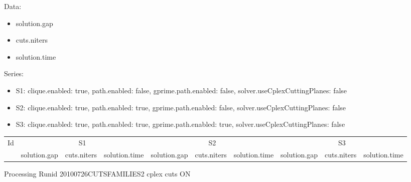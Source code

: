 \documentclass[landscape, 12pt]{report}
\begin{document}
	Data:
	\begin{itemize}
	\item solution.gap
	\item cuts.niters
	\item solution.time
	\end{itemize}
	Series:
	\begin{itemize}
	\item S1: clique.enabled: true, path.enabled: false, gprime.path.enabled: false, solver.useCplexCuttingPlanes: false
	\item S2: clique.enabled: true, path.enabled: true, gprime.path.enabled: false, solver.useCplexCuttingPlanes: false
	\item S3: clique.enabled: true, path.enabled: true, gprime.path.enabled: true, solver.useCplexCuttingPlanes: false
	\end{itemize}
	\begin{tabular}{|c|ccc|ccc|ccc|}
	\hline
	\multicolumn{1}{|c|}{Id} & \multicolumn{3}{|c|}{S1} & \multicolumn{3}{|c|}{S2} & \multicolumn{3}{|c|}{S3}
	\\
	 & solution.gap & cuts.niters & solution.time & solution.gap & cuts.niters & solution.time & solution.gap & cuts.niters & solution.time
	\\
	
	\hline 
	 \end{tabular}
	
	Processing Runid 20100726CUTSFAMILIES2 cplex cuts ON
\end{document}
